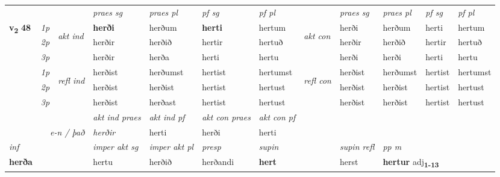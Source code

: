 \begin{longtable}[l]{X>{\footnotesize\itshape}llXXXXlXXXX}
 & &   & \textit{praes sg}  & \textit{praes pl}    & \textit{ pf sg} & \textit{pf pl} & & \textit{praes sg}  & \textit{praes pl}    & \textit{pf sg} & \textit{pf pl }  \\ \cmidrule{4-7} \cmidrule{9-12}
 \multirow{2}{*}{{{\textbf{v{\textsubscript{2}}} \Large{\textbf{48}}}}}  & 1p & \multirow{3}{*}{\begin{turn}{90}\textit{akt ind}\end{turn}} & \textbf{herði} & herðum & \textbf{herti} & hertum & \multirow{3}{*}{\begin{turn}{90}\textit{akt con}\end{turn}} &herði & herðum & herti & hertum\\*
 & 2p &  &  herðir  & herðið & hertir & hertuð & & herðir & herðið & hertir & hertuð \\*
 & 3p &  & herðir & herða & herti & hertu & & herði & herði& herti & hertu \\*
\cmidrule{4-7} \cmidrule{9-12}
 & 1p & \multirow{3}{*}{\begin{turn}{90}\textit{refl ind}\end{turn}}  & herðist & herðumst & hertist & hertumst & \multirow{3}{*}{\begin{turn}{90}\textit{refl con}\end{turn}}  &herðist & herðumst & hertist & hertumst \\*
 & 2p &  & herðist & herðist & hertist & hertust & &herðist & herðist & hertist & hertust \\*
 & 3p  & & herðist & herðast & hertist & hertust & & herðist & herðist& hertist & hertust \\*
\cmidrule{4-7} \cmidrule{9-12}

   && &  \textit{akt ind praes} & \textit{akt ind pf} & \textit{akt con praes} & \textit{akt con pf} \\*
\multicolumn{3}{r}{\textit{e-n / það}} & herðir & herti & herði & herti \\*

\cmidrule{4-7}
   {\textit{inf}} & &  & \textit{imper akt sg} & \textit{imper akt pl}   & \textit{presp} & \textit{supin} && \textit{supin refl} & \textit{pp m} \\*
  {\textbf{herða}} & && hertu  & herðið   & herðandi &  \textbf{hert} && herst & \multicolumn{2}{l}{\textbf{hertur} adj\textbf{\textsubscript{1-13}}} \\*

\midrule


\end{longtable}
